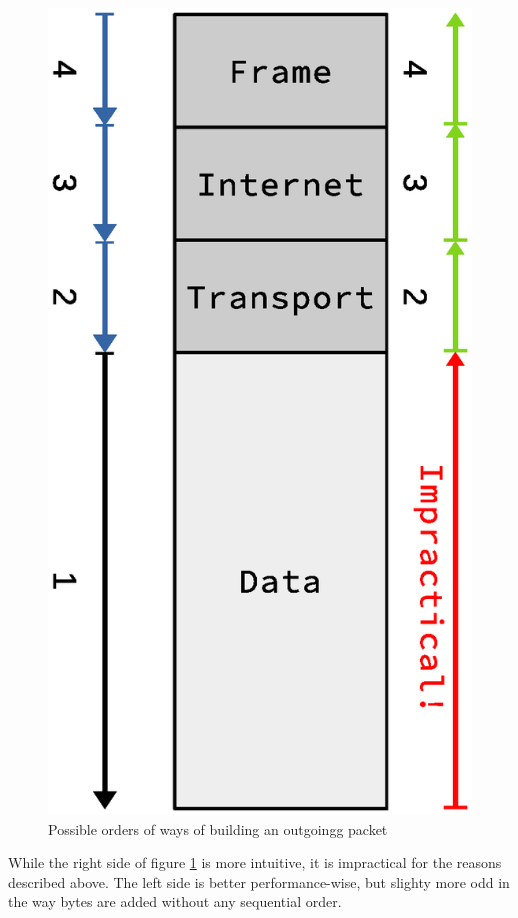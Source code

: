 \begin{figure}
    \centering
    \includegraphics[scale=0.45]{design/sending_packet_order.eps}
    \caption{Possible orders of ways of building an outgoingg packet}
    \label{fig:sending_packet_order}
\end{figure}

While the right side of figure \ref{fig:sending_packet_order} is more intuitive,
it is impractical for the reasons described above. The left side is better 
performance-wise, but slighty more odd in the way bytes are added without any 
sequential order.

